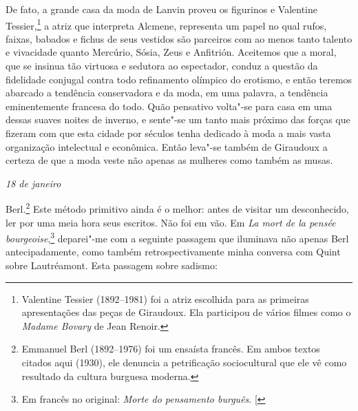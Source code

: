 De fato, a grande casa da moda de Lanvin proveu os figurinos e Valentine
Tessier,\footnote{Valentine Tessier (1892--1981) foi a atriz
  escolhida para as primeiras apresentações das peças de Giraudoux. Ela
  participou de vários filmes como o \emph{Madame Bovary} de Jean
  Renoir. \versal{[N.~O.]}} a atriz que interpreta Alcmene, representa um papel no qual
rufos, faixas, babados e fichus de seus vestidos são parceiros com ao
menos tanto talento e vivacidade quanto Mercúrio, Sósia, Zeus e
Anfitrión. Aceitemos que a moral, que se insinua tão virtuosa e sedutora
ao espectador, conduz a questão da fidelidade conjugal contra todo
refinamento olímpico do erotismo, e então teremos abarcado a tendência conservadora e da moda, em uma palavra, a tendência eminentemente francesa do todo. Quão pensativo volta"-se
para casa em uma dessas suaves noites de inverno, e sente"-se um
tanto mais próximo das forças que fizeram com que esta cidade por
séculos tenha dedicado à moda a mais vasta organização intelectual e
econômica. Então leva"-se também de Giraudoux a certeza de que a moda
veste não apenas as mulheres como também as musas.

\begin{flushright}
\emph{18 de janeiro}
\end{flushright}

Berl.\footnote{Emmanuel Berl (1892--1976) foi um
  ensaísta francês. Em ambos textos citados aqui (1930), ele denuncia a
  petrificação sociocultural que ele vê como resultado da cultura
  burguesa moderna. \versal{[N.~O.]}} Este método primitivo ainda é o melhor: antes de
visitar um desconhecido, ler por uma meia hora seus escritos. Não foi em
vão. Em \emph{La mort de la pensée bourgeoise},\footnote{Em francês no original: \emph{Morte do pensamento burguês}. {[}\versal{N.~T}{]}} deparei"-me com a seguinte
passagem que iluminava não apenas Berl antecipadamente, como também
retrospectivamente minha conversa com Quint sobre Lautréamont. Esta
passagem sobre sadismo:

